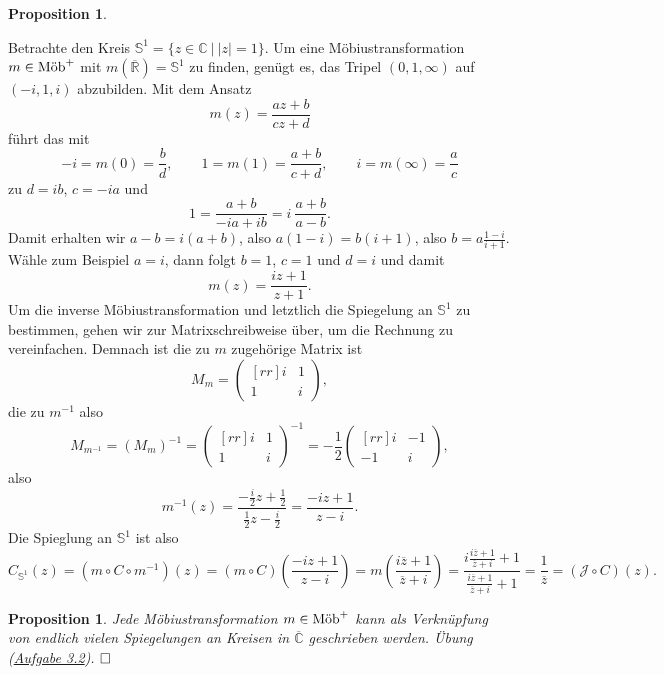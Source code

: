 \documentclass[11pt]{book}
\numberwithin{dummy}{section}
\newtheorem{proposition}[theorem]{Proposition}
\theoremstyle{nonumberbreak}
\newenvironment{pr}[1][]{\ifthenelse{\equal{#1}{}}{\proof}{\proof[#1]}\rm}{\endproof}
\newenvironment{ex}[1][]{\ifthenelse{\equal{#1}{}}{\example}{\example[#1]}\rm}{\endexample}
\newcommand{\C}{\mathbb{C}}
\newcommand{\Sph}{\mathbb{S}}
\newcommand{\CC}{\overline{\mathbb{C}}}
\newcommand{\mob}{\textup{Möb}^+}
\begin{document}
\begin{spacing}{1.4}
\begin{proposition}
\end{proposition}


\begin{ex}
Betrachte den Kreis $\mathbb{S}^1 = \{z \in \C \ \vert \ \vert z \vert = 1 \}$. Um eine Möbiustransformation $m \in \mob$ mit $m(\overline{\mathbb{R}})=\Sph^1$ zu finden, genügt es, das Tripel $(0,1,\infty)$ auf $(-i,1,i)$ abzubilden. Mit dem Ansatz 
$$m(z)= \frac{az+b}{cz+d}$$
führt das mit
$$-i = m(0)= \frac{b}{d}, \qquad 1 = m(1) = \frac{a+b}{c+d}, \qquad i = m(\infty) = \frac{a}{c}$$
zu $d=ib$, $c=-ia$ und $$1= \frac{a+b}{-ia+ib} = i\ \frac{a+b}{a-b}.$$
Damit erhalten wir $a-b= i (a+b)$, also $a(1-i)=b(i+1)$, also $b= a \frac{1-i}{i+1}$. Wähle zum Beispiel $a= i$, dann folgt $b=1$, $c=1$ und $d=i$ und damit 
$$m(z)= \frac{iz+1}{z+1}.$$ Um die inverse Möbiustransformation und letztlich die Spiegelung an $\mathbb{S}^1$ zu bestimmen, gehen wir zur Matrixschreibweise über, um die Rechnung zu vereinfachen. Demnach ist die zu $m$ zugehörige Matrix ist
$$M_m = \begin{pmatrix}[rr]i & 1 \\[-6pt] 1 & i \end{pmatrix}, $$
die zu $m^{-1}$ also
$$M_{m^{-1}} = (M_m)^{-1}= \begin{pmatrix}[rr] i & 1 \\[-6pt] 1 & i \end{pmatrix}^{-1} = -\frac{1}{2} \begin{pmatrix}[rr]i & -1 \\[-6pt] -1 & i \end{pmatrix},$$
also $$m^{-1}(z)= \frac{ - \frac{i}{2} z + \frac{1}{2}}{\frac{1}{2}z - \frac{i}{2}} = \frac{-i z +1}{z-i}.$$
Die Spieglung an $\mathbb{S}^1$ ist also
$$C_{\mathbb{S}^1}(z) = (m \circ C \circ m^{-1})(z) = (m \circ C) \left( \frac{-i z + 1}{ z - i}\right) = m \left( \frac{i\overline{z} +1}{\overline{z}+i}\right) = \frac{i \frac{i\overline{z}+1}{\overline{z}+i} +1}{\frac{i \overline{z} +1}{\overline{z}+i} +1} = \frac{1}{\overline{z}} = (\mathcal{J} \circ C)(z).$$

\end{ex}


\hypertarget{propeinssechsacht}{}
\begin{proposition}   %
Jede Möbiustransformation $m \in \mob$ kann als Verknüpfung von endlich vielen Spiegelungen an Kreisen in $\CC$ geschrieben werden.
\begin{pr}
Übung (\hyperlink{Adreizwei}{Aufgabe 3.2}). $\hfill \Box$
\end{pr}
\end{proposition}



\end{spacing}
\end{document}
